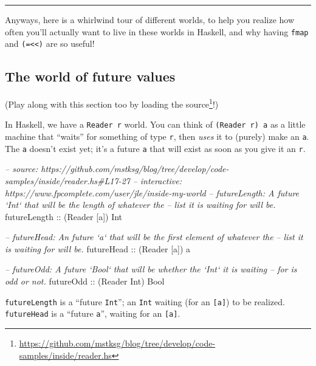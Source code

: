 \documentclass[]{article}
\newenvironment{Shaded}{}{}
\newcommand{\DataTypeTok}[1]{\textcolor[rgb]{0.56,0.13,0.00}{{#1}}}
\newcommand{\CommentTok}[1]{\textcolor[rgb]{0.38,0.63,0.69}{\textit{{#1}}}}
\newcommand{\OtherTok}[1]{\textcolor[rgb]{0.00,0.44,0.13}{{#1}}}
\newcommand{\NormalTok}[1]{{#1}}
\renewcommand{\href}[2]{#2\footnote{\url{#1}}}
\begin{document}
\begin{center}\rule{0.5\linewidth}{\linethickness}\end{center}

Anyways, here is a whirlwind tour of different worlds, to help you realize how often you'll actually
want to live in these worlds in Haskell, and why having \texttt{fmap} and
\texttt{(=\textless{}\textless{})} are so useful!

\subsection{The world of future values}\label{the-world-of-future-values}

(Play along with this section too by
\href{https://github.com/mstksg/blog/tree/develop/code-samples/inside/reader.hs}{loading the
source}!)

In Haskell, we have a \texttt{Reader\ r} world. You can think of \texttt{(Reader\ r)\ a} as a little
machine that ``waits'' for something of type \texttt{r}, then \emph{uses} it to (purely) make an
\texttt{a}. The \texttt{a} doesn't exist yet; it's a future \texttt{a} that will exist as soon as
you give it an \texttt{r}.

\begin{Shaded}
\begin{Highlighting}[]
\CommentTok{-- source: https://github.com/mstksg/blog/tree/develop/code-samples/inside/reader.hs#L17-27}
\CommentTok{-- interactive: https://www.fpcomplete.com/user/jle/inside-my-world}
\CommentTok{-- futureLength: A future `Int` that will be the length of whatever the}
\CommentTok{--      list it is waiting for will be.}
\OtherTok{futureLength ::} \NormalTok{(}\DataTypeTok{Reader} \NormalTok{[a]) }\DataTypeTok{Int}

\CommentTok{-- futureHead: An future `a` that will be the first element of whatever the}
\CommentTok{--      list it is waiting for will be.}
\OtherTok{futureHead   ::} \NormalTok{(}\DataTypeTok{Reader} \NormalTok{[a]) a}

\CommentTok{-- futureOdd: A future `Bool` that will be whether the `Int` it is waiting}
\CommentTok{--      for is odd or not.}
\OtherTok{futureOdd    ::} \NormalTok{(}\DataTypeTok{Reader} \DataTypeTok{Int}\NormalTok{) }\DataTypeTok{Bool}
\end{Highlighting}
\end{Shaded}

\texttt{futureLength} is a ``future \texttt{Int}''; an \texttt{Int} waiting (for an
\texttt{{[}a{]}}) to be realized. \texttt{futureHead} is a ``future \texttt{a}'', waiting for an
\texttt{{[}a{]}}.
\end{document}
